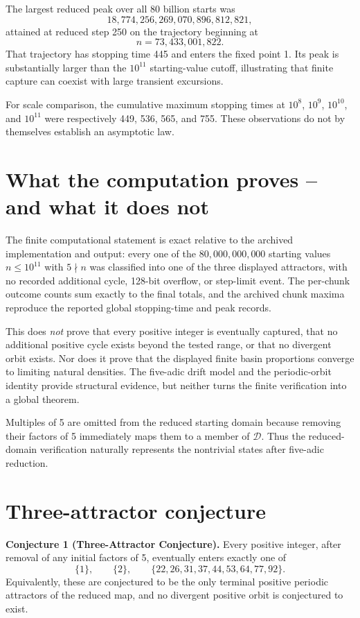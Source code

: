 \documentclass[11pt]{article}
\begin{document}
The largest reduced peak over all $80$ billion starts was
\[
\boxed{18{,}774{,}256{,}269{,}070{,}896{,}812{,}821},
\]
attained at reduced step 250 on the trajectory beginning at
\[
n=73{,}433{,}001{,}822.
\]
That trajectory has stopping time 445 and enters the fixed point 1. Its peak is substantially larger than the $10^{11}$ starting-value cutoff, illustrating that finite capture can coexist with large transient excursions.

For scale comparison, the cumulative maximum stopping times at $10^8$, $10^9$, $10^{10}$, and $10^{11}$ were respectively 449, 536, 565, and 755. These observations do not by themselves establish an asymptotic law.

\section{What the computation proves -- and what it does not}
The finite computational statement is exact relative to the archived implementation and output: every one of the $80{,}000{,}000{,}000$ starting values $n\le10^{11}$ with $5\nmid n$ was classified into one of the three displayed attractors, with no recorded additional cycle, 128-bit overflow, or step-limit event. The per-chunk outcome counts sum exactly to the final totals, and the archived chunk maxima reproduce the reported global stopping-time and peak records.

This does \emph{not} prove that every positive integer is eventually captured, that no additional positive cycle exists beyond the tested range, or that no divergent orbit exists. Nor does it prove that the displayed finite basin proportions converge to limiting natural densities. The five-adic drift model and the periodic-orbit identity provide structural evidence, but neither turns the finite verification into a global theorem.

Multiples of 5 are omitted from the reduced starting domain because removing their factors of 5 immediately maps them to a member of $\mathcal{D}$. Thus the reduced-domain verification naturally represents the nontrivial states after five-adic reduction.

\section{Three-attractor conjecture}
\textbf{Conjecture 1 (Three-Attractor Conjecture).} Every positive integer, after removal of any initial factors of 5, eventually enters exactly one of
\[
\{1\},\qquad \{2\},\qquad \{22,26,31,37,44,53,64,77,92\}.
\]
Equivalently, these are conjectured to be the only terminal positive periodic attractors of the reduced map, and no divergent positive orbit is conjectured to exist.
\end{document}
